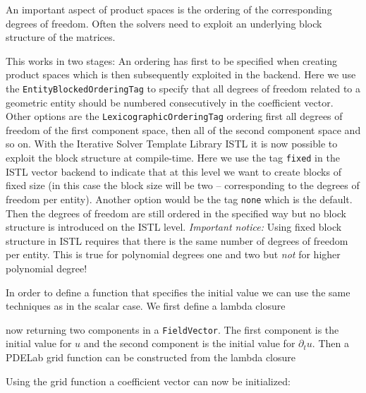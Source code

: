 \documentclass[a4paper,12pt]{article}
\begin{document}
An important aspect of product spaces is the ordering of the corresponding degrees
of freedom. Often the solvers need to exploit an underlying block structure
of the matrices.

This works in two stages: An ordering has first to be specified when creating product spaces
which is then subsequently exploited in the backend.
Here we use the \lstinline{EntityBlockedOrderingTag} to specify that all degrees of
freedom related to a geometric entity should be numbered consecutively in
the coefficient vector. Other options are the \lstinline{LexicographicOrderingTag}
ordering first all degrees of freedom of the first component space, then
all of the second component space and so on.
With the Iterative Solver Template Library ISTL it is now
possible to exploit the block structure at compile-time.
Here we use the tag \lstinline{fixed} in the ISTL vector backend to indicate
that at this level we want to create blocks of fixed size (in this case the block size will be two --
corresponding to the degrees of freedom per entity). Another option
would be the tag \lstinline{none} which is the default. Then the degrees
of freedom are still ordered in the specified way but no block structure is
introduced on the ISTL level. \textit{Important notice:} Using fixed block
structure in ISTL requires that there is the same number of degrees of freedom
per entity. This is true for polynomial degrees one and two but \textit{not}
for higher polynomial degree!

In order to define a function that specifies the initial value we can
use the same techniques as in the scalar case. We first define a lambda
closure

now returning two components in a \lstinline{FieldVector}.
The first component is the initial value for $u$ and the second component
is the initial value for $\partial_t u$. Then a PDELab grid function
can be constructed from the lambda closure


Using the grid function a coefficient vector can now be initialized:


% 
\end{document}
